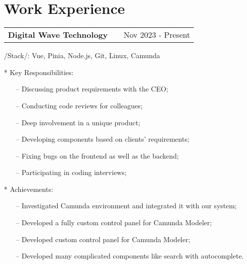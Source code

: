 \documentclass[a4paper,12pt]{article}
\makeatletter
\newenvironment{joblong}[2]
    {
    \begin{tabularx}{\linewidth}{@{}l X r@{}}
    \textbf{#1} & \hfill &  #2 \\[3.75pt]
    \end{tabularx}
    \begin{minipage}[t]{\linewidth}
    \begin{itemize}[nosep,after=\strut, leftmargin=1em, itemsep=3pt,label=--]
    }
    {
    \end{itemize}
    \end{minipage}    
    }
\makeatother
\begin{document}
\section{Work Experience}

\begin{joblong}{Digital Wave Technology}{Nov 2023 - Present}
  \item /Stack/: {Vue, Pinia, Node.js, Git, Linux, Camunda}
{\fontsize{13.2pt}{14.6pt}\selectfont
  \item[*] Key Responsibilities:
    \begin{itemize}
      \item[--] Discussing product requirements with the CEO;
      \item[--] Conducting code reviews for colleagues;
      \item[--] Deep involvement in a unique product; 
      \item[--] Developing components based on clients' requirements; 
      \item[--] Fixing bugs on the frontend as well as the backend; 
      \item[--] Participating in coding interviews;
    \end{itemize}

  \item[*] Achievements:
    \begin{itemize}
      \item[--] Investigated Camunda environment and integrated it with our system;
      \item[--] Developed a fully custom control panel for Camunda Modeler;
      \item[--] Developed custom control panel for Camunda Modeler;
      \item[--] Developed many complicated components like search with autocomplete.
    \end{itemize}
}
\end{joblong}
\end{document}
